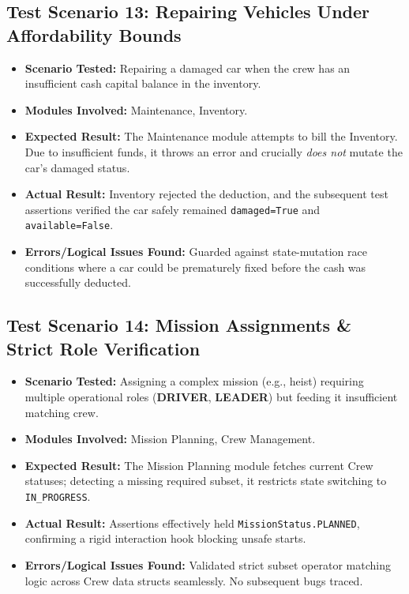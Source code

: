 \documentclass[12pt,a4paper]{article}
\begin{document}
\subsection{Test Scenario 13: Repairing Vehicles Under Affordability Bounds}
\begin{itemize}
    \item \textbf{Scenario Tested:} Repairing a damaged car when the crew has an insufficient cash capital balance in the inventory.
    \item \textbf{Modules Involved:} Maintenance, Inventory.
    \item \textbf{Expected Result:} The Maintenance module attempts to bill the Inventory. Due to insufficient funds, it throws an error and crucially \textit{does not} mutate the car's damaged status.
    \item \textbf{Actual Result:} Inventory rejected the deduction, and the subsequent test assertions verified the car safely remained \texttt{damaged=True} and \texttt{available=False}.
    \item \textbf{Errors/Logical Issues Found:} Guarded against state-mutation race conditions where a car could be prematurely fixed before the cash was successfully deducted.
\end{itemize}

\subsection{Test Scenario 14: Mission Assignments \& Strict Role Verification}
\begin{itemize}
    \item \textbf{Scenario Tested:} Assigning a complex mission (e.g., heist) requiring multiple operational roles (\textbf{DRIVER}, \textbf{LEADER}) but feeding it insufficient matching crew.
    \item \textbf{Modules Involved:} Mission Planning, Crew Management.
    \item \textbf{Expected Result:} The Mission Planning module fetches current Crew statuses; detecting a missing required subset, it restricts state switching to \texttt{IN\_PROGRESS}.
    \item \textbf{Actual Result:} Assertions effectively held \texttt{MissionStatus.PLANNED}, confirming a rigid interaction hook blocking unsafe starts.
    \item \textbf{Errors/Logical Issues Found:} Validated strict subset operator matching logic across Crew data structs seamlessly. No subsequent bugs traced.
\end{itemize}
\end{document}
